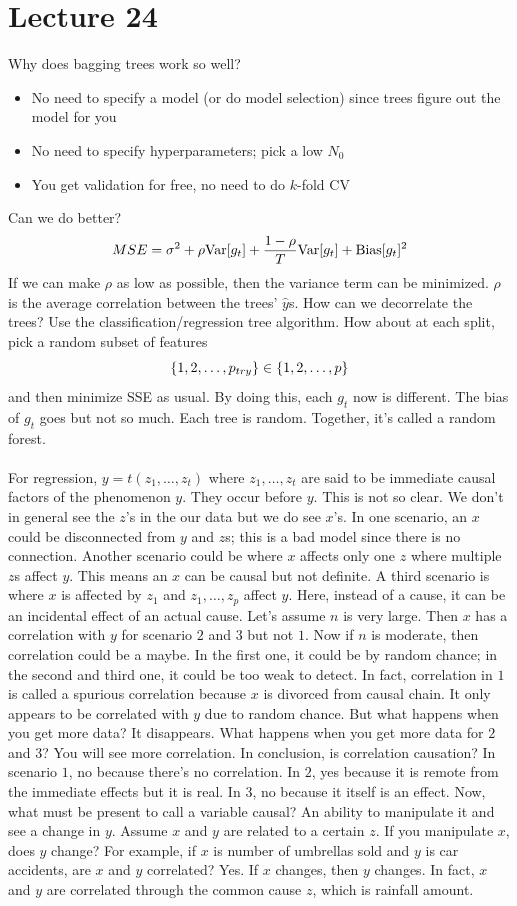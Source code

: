 \documentclass[12pt]{article}
\begin{document}
\section{Lecture 24}
Why does bagging trees work so well? \begin{itemize} 
\item No need to specify a model (or do model selection) since trees figure out the model for you 
\item No need to specify hyperparameters; pick a low $N_0$
\item You get validation for free, no need to do $k$-fold CV 
\end{itemize} 
Can we do better? $$ MSE = \sigma^2 + \rho \mathrm{Var}[ g_t ] + \frac{1-\rho}{T}\mathrm{Var}[ g_t ] + \text{Bias}[g_t]^2 $$ 
If we can make $\rho$ as low as possible, then the variance term can be minimized. $\rho$ is the average correlation between the trees' $\hat{y}$s. How can we decorrelate the trees? Use the classification/regression tree algorithm. How about at each split, pick a random subset of features $$ \left\{ 1,2,\dots,p_{try} \right\} \in \left\{ 1,2,\dots,p \right\}$$ and then minimize SSE as usual. By doing this, each $g_t$ now is different. The bias of $g_t$ goes but not so much. Each tree is random. Together, it's called a random forest. \\~\\
For regression, $y = t(z_1,\dots,z_t)$ where $z_1,\dots,z_t$ are said to be immediate causal factors of the phenomenon $y$. They occur before $y$. This is not so clear. We don't in general see the $z$'s in the our data but we do see $x$'s. In one scenario, an $x$ could be disconnected from $y$ and $z$s; this is a bad model since there is no connection. Another scenario could be where $x$ affects only one $z$ where multiple $z$s affect $y$. This means an $x$ can be causal but not definite. A third scenario is where $x$ is affected by $z_1$ and $z_1,\dots,z_p$ affect $y$. Here, instead of a cause, it can be an incidental effect of an actual cause. Let's assume $n$ is very large. Then $x$ has a correlation with $y$ for scenario $2$ and $3$ but not $1$. Now if $n$ is moderate, then correlation could be a maybe. In the first one, it could be by random chance; in the second and third one, it could be too weak to detect. In fact, correlation in $1$ is called a spurious correlation because $x$ is divorced from causal chain. It only appears to be correlated with $y$ due to random chance. But what happens when you get more data? It disappears. What happens when you get more data for $2$ and $3$? You will see more correlation. In conclusion, is correlation causation? In scenario $1$, no because there's no correlation. In $2$, yes because it is remote from the immediate effects but it is real. In $3$, no because it itself is an effect. Now, what must be present to call a variable causal? An ability to manipulate it and see a change in $y$. Assume $x$ and $y$ are related to a certain $z$. If you manipulate $x$, does $y$ change? For example, if $x$ is number of umbrellas sold and $y$ is car accidents, are $x$ and $y$ correlated? Yes. If $x$ changes, then $y$ changes. In fact, $x$ and $y$ are correlated through the common cause $z$, which is rainfall amount. 
\end{document}
